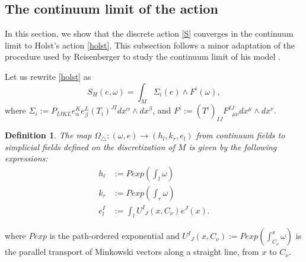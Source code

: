 \documentclass{article}
\newtheorem{definition}{Definition}
\begin{document}
\subsection{The continuum limit of the action}
\label{ContinuumLimit}

In this section, we show that the discrete action \eqref{S} converges in the continuum limit to Holst's action \eqref{holst}. 
This subsection follows a minor adaptation of the procedure used by Reisenberger to study the continuum limit of his model \cite{Rei1}.

Let us rewrite \eqref{holst} as 
\begin{equation}\label{holst2}
	S_{H}\left(e,\omega\right)=\int_{M}\Sigma_{i}(e)\wedge F^{i}(\omega), 
\end{equation}	
where 
$\Sigma_i:=P_{IJKL}e_{\alpha}^{K}e_{\beta}^{L}\left(T_{i}\right)^{JI}dx^{\alpha}\wedge dx^{\beta}$, and $F^{i}:=\left(T^{i}\right)_{IJ}F_{~~~\mu\nu}^{IJ}dx^{\mu}\wedge dx^{\nu}$. 


\begin{definition}\label{map}
	The map $\Omega_{\triangle}:\left(\omega,e\right)\rightarrow\left(h_l,k_r,e_l\right)$ from continuum fields to simplicial fields defined on the discretization of $M$ is given by the following expressions:
	\begin{align}\label{map2}
		h_{l}&:=Pexp\left(\int_{l}\omega\right)\\
		k_{r}&:=Pexp\left(\int_{r}\omega\right)\\
		e_{l}^{I}&:=\int_{l}U_{~~J}^{I}(x,C_{\nu})e^{J}(x).
	\end{align}	
\end{definition}	 
\noindent where $Pexp$ is the path-ordered exponential and $U_{~~J}^{I}(x,C_{\nu}):=Pexp\left(\int_{C_{\nu}}^{x}\omega\right)$ is the parallel transport of Minkowski vectors along a straight line, from $x$ to $C_{\nu}$. 
\end{document}
